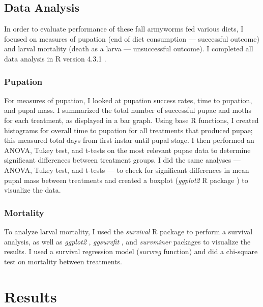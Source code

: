 \documentclass[12pt,]{article}
\begin{document}
\hypertarget{data-analysis}{%
\subsection{\texorpdfstring{\textbf{Data
Analysis}}{Data Analysis}}\label{data-analysis}}

In order to evaluate performance of these fall armyworms fed various
diets, I focused on measures of pupation (end of diet consumption ---
successful outcome) and larval mortality (death as a larva ---
unsuccessful outcome). I completed all data analysis in R version 4.3.1
\autocite{r_core_team_r_2023}.

\hypertarget{pupation}{%
\subsubsection{Pupation}\label{pupation}}

For measures of pupation, I looked at pupation success rates, time to
pupation, and pupal mass. I summarized the total number of successful
pupae and moths for each treatment, as displayed in a bar graph. Using
base R functions, I created histograms for overall time to pupation for
all treatments that produced pupae; this measured total days from first
instar until pupal stage. I then performed an ANOVA, Tukey test, and
t-tests on the most relevant pupae data to determine significant
differences between treatment groups. I did the same analyses --- ANOVA,
Tukey test, and t-tests --- to check for significant differences in mean
pupal mass between treatments and created a boxplot (\emph{ggplot2} R
package \autocite{wickham_ggplot2_2016}) to visualize the data.

\hypertarget{mortality}{%
\subsubsection{Mortality}\label{mortality}}

To analyze larval mortality, I used the \emph{survival} R package
\autocite{therneau_package_2023,bos_ants_2015} to perform a survival
analysis, as well as \emph{ggplot2} \autocite{wickham_ggplot2_2016},
\emph{ggsurvfit} \autocite{sjoberg_ggsurvfit_2023}, and \emph{survminer}
\autocite{kassambara_survminer_2021} packages to visualize the results.
I used a survival regression model (\emph{survreg} function) and did a
chi-square test on mortality between treatments.

\hypertarget{results}{%
\section{Results}\label{results}}
\end{document}

